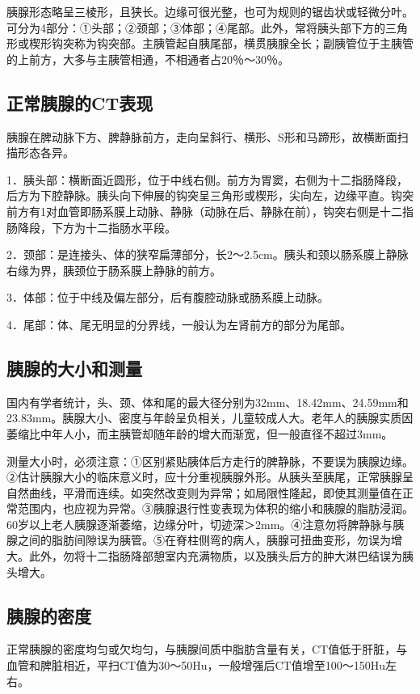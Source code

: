 胰腺形态略呈三棱形，且狭长。边缘可很光整，也可为规则的锯齿状或轻微分叶。可分为4部分：①头部；②颈部；③体部；④尾部。此外，常将胰头部下方的三角形或楔形钩突称为钩突部。主胰管起自胰尾部，横贯胰腺全长；副胰管位于主胰管的上前方，大多与主胰管相通，不相通者占20％～30％。

\subsection{正常胰腺的CT表现}

胰腺在脾动脉下方、脾静脉前方，走向呈斜行、横形、S形和马蹄形，故横断面扫描形态各异。

1．胰头部：横断面近圆形，位于中线右侧。前方为胃窦，右侧为十二指肠降段，后方为下腔静脉。胰头向下伸展的钩突呈三角形或楔形，尖向左，边缘平直。钩突前方有1对血管即肠系膜上动脉、静脉（动脉在后、静脉在前），钩突右侧是十二指肠降段，下方为十二指肠水平段。

2．颈部：是连接头、体的狭窄扁薄部分，长2～2.5cm。胰头和颈以肠系膜上静脉右缘为界，胰颈位于肠系膜上静脉的前方。

3．体部：位于中线及偏左部分，后有腹腔动脉或肠系膜上动脉。

4．尾部：体、尾无明显的分界线，一般认为左肾前方的部分为尾部。

\subsection{胰腺的大小和测量}

国内有学者统计，头、颈、体和尾的最大径分别为32mm、18.42mm、24.59mm和23.83mm。胰腺大小、密度与年龄呈负相关，儿童较成人大。老年人的胰腺实质因萎缩比中年人小，而主胰管却随年龄的增大而渐宽，但一般直径不超过3mm。

测量大小时，必须注意：①区别紧贴胰体后方走行的脾静脉，不要误为胰腺边缘。②估计胰腺大小的临床意义时，应十分重视胰腺外形。从胰头至胰尾，正常胰腺呈自然曲线，平滑而连续。如突然改变则为异常；如局限性隆起，即使其测量值在正常范围内，也应视为异常。③胰腺退行性变表现为体积的缩小和胰腺的脂肪浸润。60岁以上老人胰腺逐渐萎缩，边缘分叶，切迹深＞2mm。④注意勿将脾静脉与胰腺之间的脂肪间隙误为胰管。⑤在脊柱侧弯的病人，胰腺可扭曲变形，勿误为增大。此外，勿将十二指肠降部憩室内充满物质，以及胰头后方的肿大淋巴结误为胰头增大。

\subsection{胰腺的密度}

正常胰腺的密度均匀或欠均匀，与胰腺间质中脂肪含量有关，CT值低于肝脏，与血管和脾脏相近，平扫CT值为30～50Hu，一般增强后CT值增至100～150Hu左右。

